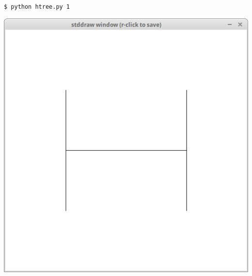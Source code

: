 \documentclass[8pt,a4paper,compress,handout]{beamer}
\begin{document}
\begin{frame}[fragile]
\begin{minipage}{160pt}
\begin{lstlisting}[language={}]
$ python htree.py 1
\end{lstlisting}
\end{minipage}%
\begin{minipage}{140pt}
\hfill \includegraphics[scale=0.15]{figures/htree1.png}
\end{minipage}

\smallskip


\end{frame}
\end{document}
